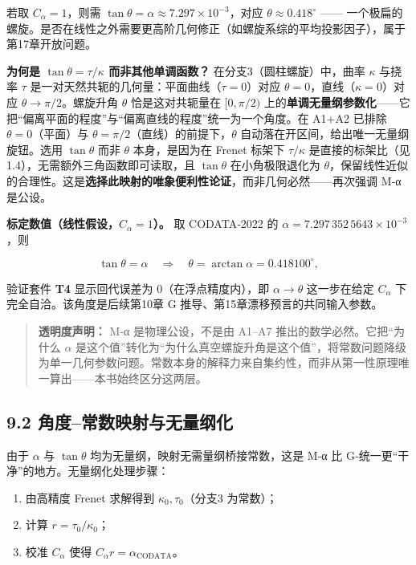 若取 \(C_\alpha=1\)，则需
\(\tan\theta=\alpha\approx 7.297\times10^{-3}\)，对应
\(\theta\approx0.418^\circ\) ------
一个极扁的螺旋。是否在线性之外需要更高阶几何修正（如螺旋系综的平均投影因子），属于第17章开放问题。

\textbf{为何是 \(\tan\theta=\tau/\kappa\) 而非其他单调函数？}
在分支3（圆柱螺旋）中，曲率 \(\kappa\) 与挠率 \(\tau\)
是一对天然共轭的几何量：平面曲线（\(\tau=0\)）对应
\(\theta=0\)，直线（\(\kappa=0\)）对应 \(\theta\to\pi/2\)。螺旋升角
\(\theta\) 恰是这对共轭量在 \([0,\pi/2)\)
上的\textbf{单调无量纲参数化}------它把``偏离平面的程度''与``偏离直线的程度''统一为一个角度。在
A1+A2 已排除 \(\theta=0\)（平面）与
\(\theta=\pi/2\)（直线）的前提下，\(\theta\)
自动落在开区间，给出唯一无量纲旋钮。选用 \(\tan\theta\) 而非 \(\theta\)
本身，是因为在 Frenet 标架下 \(\tau/\kappa\) 是直接的标架比（见
1.4），无需额外三角函数即可读取，且 \(\tan\theta\) 在小角极限退化为
\(\theta\)，保留线性近似的合理性。这是\textbf{选择此映射的唯象便利性论证}，而非几何必然------再次强调
M‑α 是公设。

\textbf{标定数值（线性假设，\(C_\alpha=1\)）。} 取 CODATA‑2022 的
\(\alpha=7.297\,352\,5643\times10^{-3}\)，则

\[
\tan\theta=\alpha\quad\Longrightarrow\quad \theta=\arctan\alpha=0.418100^\circ,
\]

验证套件 \textbf{T4} 显示回代误差为 0（在浮点精度内），即
\(\alpha\to\theta\) 这一步在给定 \(C_\alpha\)
下完全自洽。该角度是后续第10章 G 推导、第15章漂移预言的共同输入参数。

\begin{quote}
\textbf{透明度声明：} M‑α 是物理公设，不是由 A1--A7
推出的数学必然。它把``为什么 \(\alpha\)
是这个值''转化为``为什么真空螺旋升角是这个值''，将常数问题降级为单一几何参数问题。常数本身的解释力来自集约性，而非从第一性原理唯一算出------本书始终区分这两层。
\end{quote}

\subsection{9.2
角度--常数映射与无量纲化}\label{ux89d2ux5ea6ux5e38ux6570ux6620ux5c04ux4e0eux65e0ux91cfux7eb2ux5316}

由于 \(\alpha\) 与 \(\tan\theta\) 均为无量纲，映射无需量纲桥接常数，这是
M‑α 比 G‑统一更``干净''的地方。无量纲化处理步骤：

\begin{enumerate}
\def\labelenumi{\arabic{enumi}.}
\tightlist
\item
  由高精度 Frenet 求解得到 \(\kappa_0,\tau_0\)（分支3 为常数）；
\item
  计算 \(r=\tau_0/\kappa_0\)；
\item
  校准 \(C_\alpha\) 使得 \(C_\alpha r=\alpha_{\mathrm{CODATA}}\)。
\end{enumerate}

